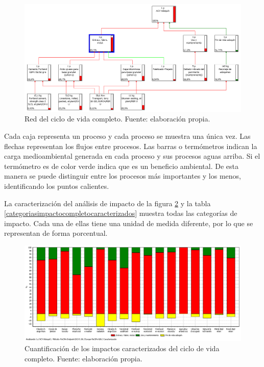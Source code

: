 \begin{figure}[!htb]
\centering
\includegraphics[width=14cm]{img/completo_red.png}
\caption[Red del ciclo de vida completo.]{Red del ciclo de vida completo. Fuente: elaboración propia.}
\label{fig:completo_red}
\end{figure}

Cada caja representa un proceso y cada proceso se muestra una única vez. Las flechas representan los flujos entre procesos. Las barras o termómetros indican la carga medioambiental generada en cada proceso y sus procesos aguas arriba. Si el termómetro es de color verde indica que es un beneficio ambiental. De esta manera se puede distinguir entre los procesos más importantes y los menos, identificando los puntos calientes.

La caracterización del análisis de impacto de la figura \ref{fig:completo_caracterizacion} y la tabla \ref{categoriasimpactocompletocaracterizados} muestra todas las categorías de impacto. Cada una de ellas tiene una unidad de medida diferente, por lo que se representan de forma porcentual.

\begin{figure}[!htb]
\centering
\includegraphics[width=15cm]{img/completo_caracterizacion.png}
\caption[Cuantificación de los impactos caracterizados del ciclo de vida completo.]{Cuantificación de los impactos caracterizados del ciclo de vida completo. Fuente: elaboración propia.}
\label{fig:completo_caracterizacion}
\end{figure}

